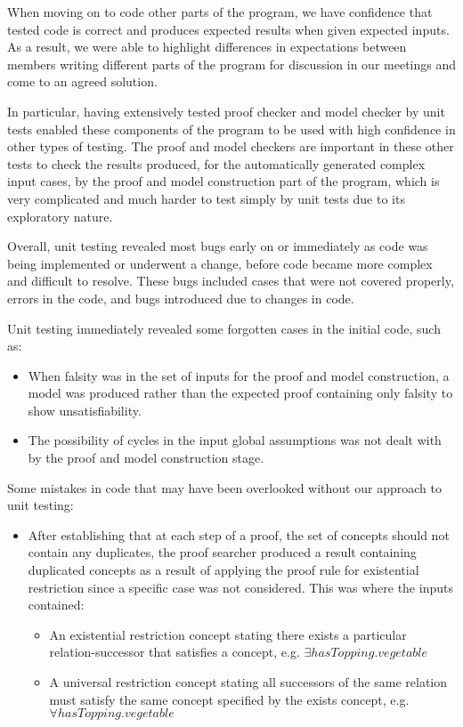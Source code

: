 When moving on to code other parts of the program, we have confidence that tested code is correct and produces expected results when given expected inputs. As a result, we were able to highlight differences in expectations between members writing different parts of the program for discussion in our meetings and come to an agreed solution.

In particular, having extensively tested proof checker and model checker by unit tests enabled these components of the program to be used with high confidence in other types of testing. The proof and model checkers are important in these other tests to check the results produced, for the automatically generated complex input cases, by the proof and model construction part of the program, which is very complicated and much harder to test simply by unit tests due to its exploratory nature.

Overall, unit testing revealed most bugs early on or immediately as code was being implemented or underwent a change, before code became more complex and difficult to resolve. These bugs included cases that were not covered properly, errors in the code, and bugs introduced due to changes in code.

Unit testing immediately revealed some forgotten cases in the initial code, such as:

\begin{itemize}
\item When falsity was in the set of inputs for the proof and model construction, a model was produced rather than the expected proof containing only falsity to show unsatisfiability.
\item The possibility of cycles in the input global assumptions was not dealt with by the proof and model construction stage.
\end{itemize}

Some mistakes in code that may have been overlooked without our approach to unit testing:

\begin{itemize}
\item After establishing that at each step of a proof, the set of concepts should not contain any duplicates, the proof searcher produced a result containing duplicated concepts as a result of applying the proof rule for existential restriction since a specific case was not considered. This was where the inputs contained:
\begin{itemize}
\item An existential restriction concept stating there exists a particular relation-successor that satisfies a concept, e.g. $\exists hasTopping . vegetable $
\item A universal restriction concept stating all successors of the same relation must satisfy the same concept specified by the exists concept, e.g. $ \forall hasTopping . vegetable $
\end{itemize}
\end{itemize}

